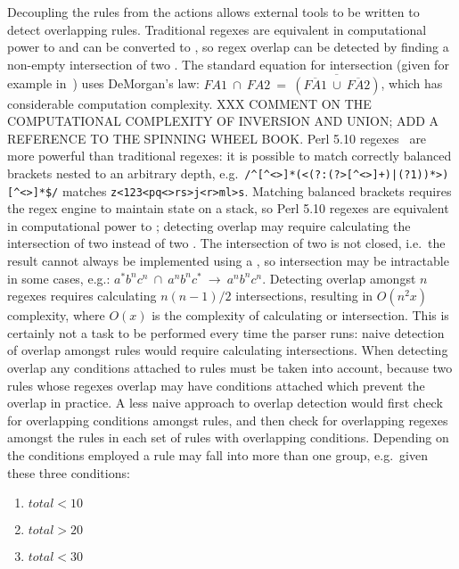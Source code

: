 Decoupling the rules from the actions allows external tools to be written
to detect overlapping rules.  Traditional regexes are equivalent in
computational power to  and can be converted to ,
so regex overlap can be detected by finding a non-empty intersection of two
\@.  The standard equation for  intersection (given
for example in~\cite{intersection-of-NFA-using-Z}) uses DeMorgan's law:
$FA1~\cap{}~FA2~=~\overline{(\overline{FA1}~\cup{}~\overline{FA2})}$, which
has considerable computation complexity.  XXX COMMENT ON THE COMPUTATIONAL
COMPLEXITY OF INVERSION AND UNION\@; ADD A REFERENCE TO THE SPINNING WHEEL
BOOK\@.  Perl 5.10 regexes~\cite{perlre} are more powerful than traditional
regexes: it is possible to match correctly balanced brackets nested to an
arbitrary depth, e.g.\ \verb!/^[^<>]*(<(?:(?>[^<>]+)|(?1))*>)[^<>]*$/!
matches \verb!z<123<pq<>rs>j<r>ml>s!.  Matching balanced brackets requires
the regex engine to maintain state on a stack, so Perl 5.10 regexes are
equivalent in computational power to ; detecting overlap may
require calculating the intersection of two  instead of two
.  The intersection of two  is not closed, i.e.\
the result cannot always be implemented using a , so
intersection may be intractable in some cases, e.g.:
$a^{*}b^{n}c^{n}~\cap~a^{n}b^{n}c^{*}~\rightarrow~a^{n}b^{n}c^{n}$.
Detecting overlap amongst $n$ regexes requires calculating $n(n-1)/2$
intersections, resulting in $O(n^2x)$ complexity, where $O(x)$ is the
complexity of calculating \acronym{FA} or \acronym{PDA} intersection.  This
is certainly not a task to be performed every time the parser runs: naive
detection of overlap amongst \parsernames{} \numberOFrules{} rules would
require calculating \numberOFruleINTERSECTIONS{} intersections.  When
detecting overlap any conditions attached to rules must be taken into
account, because two rules whose regexes overlap may have conditions
attached which prevent the overlap in practice.  A less naive approach to
overlap detection would first check for overlapping conditions amongst
rules, and then check for overlapping regexes amongst the rules in each set
of rules with overlapping conditions.  Depending on the conditions employed
a rule may fall into more than one group, e.g.\ given these three
conditions:

\begin{enumerate}

    \squeezeitems{}

    \item $total < 10$

    \item $total > 20$

    \item $total < 30$

\end{enumerate}

